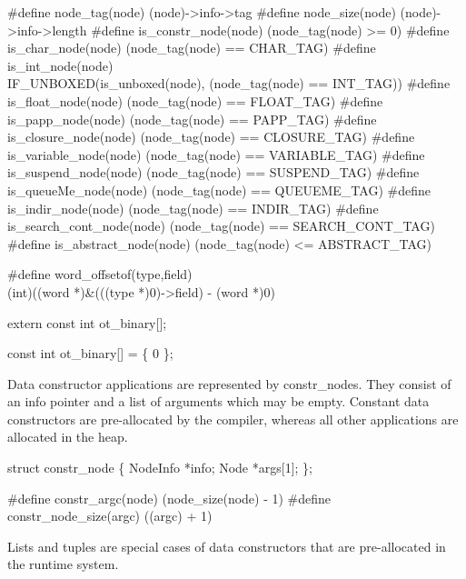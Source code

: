 #define node_tag(node)          (node)->info->tag
#define node_size(node)         (node)->info->length
#define is_constr_node(node)    (node_tag(node) >= 0)
#define is_char_node(node)      (node_tag(node) == CHAR_TAG)
#define is_int_node(node) \\
    IF_UNBOXED(is_unboxed(node), (node_tag(node) == INT_TAG))
#define is_float_node(node)     (node_tag(node) == FLOAT_TAG)
#define is_papp_node(node)      (node_tag(node) == PAPP_TAG)
#define is_closure_node(node)   (node_tag(node) == CLOSURE_TAG)
#define is_variable_node(node)  (node_tag(node) == VARIABLE_TAG)
#define is_suspend_node(node)   (node_tag(node) == SUSPEND_TAG)
#define is_queueMe_node(node)   (node_tag(node) == QUEUEME_TAG)
#define is_indir_node(node)     (node_tag(node) == INDIR_TAG)
#define is_search_cont_node(node) (node_tag(node) == SEARCH_CONT_TAG)
#define is_abstract_node(node)  (node_tag(node) <= ABSTRACT_TAG)

#define word_offsetof(type,field) \\
    (int)((word *)&(((type *)0)->field) - (word *)0)

extern const int ot_binary[];

\nwendcode{}\nwdocspar
\nwenddocs{}\plusendmoddef\nwstartdeflinemarkup{}\nwenddeflinemarkup
const int ot_binary[] = \{ 0 \};

\nwendcode{}\nwdocspar
Data constructor applications are represented by {\Tt{}constr{\_}node\nwendquote}s.
They consist of an info pointer and a list of arguments which may be
empty. Constant data constructors are pre-allocated by the compiler,
whereas all other applications are allocated in the heap.

\nwenddocs{}\plusendmoddef\nwstartdeflinemarkup{}\nwenddeflinemarkup
struct constr_node \{
    NodeInfo *info;
    Node     *args[1];
\};

#define constr_argc(node)       (node_size(node) - 1)
#define constr_node_size(argc)  ((argc) + 1)

\nwendcode{}\nwdocspar
Lists and tuples are special cases of data constructors that are
pre-allocated in the runtime system.

